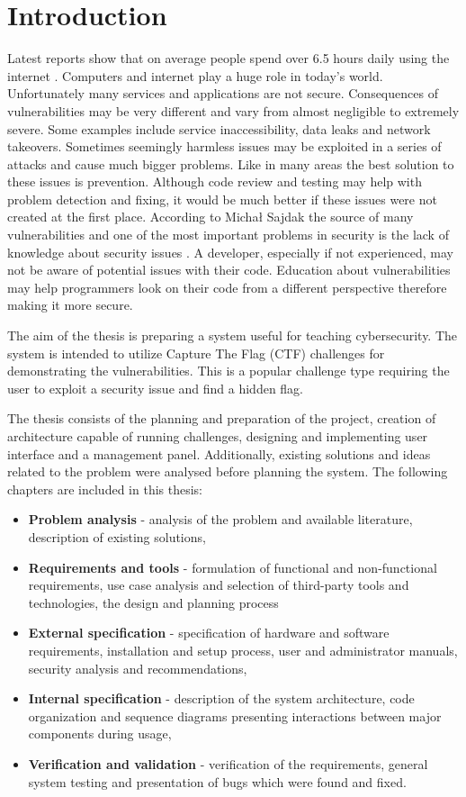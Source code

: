 \chapter{Introduction}

Latest reports show that on average people spend over 6.5 hours daily using the internet \cite{bib:digital-2023}. Computers and internet play a huge role in today's world. Unfortunately many services and applications are not secure. Consequences of vulnerabilities may be very different and vary from almost negligible to extremely severe. Some examples include service inaccessibility, data leaks and network takeovers. Sometimes seemingly harmless issues may be exploited in a series of attacks and cause much bigger problems. Like in many areas the best solution to these issues is prevention. Although code review and testing may help with problem detection and fixing, it would be much better if these issues were not created at the first place. According to Michał Sajdak the source of many vulnerabilities and one of the most important problems in security is the lack of knowledge about security issues \cite{bib:securitum-wstep}. A developer, especially if not experienced, may not be aware of potential issues with their code. Education about vulnerabilities may help programmers look on their code from a different perspective therefore making it more secure.

The aim of the thesis is preparing a system useful for teaching cybersecurity. The system is intended to utilize Capture The Flag (CTF) challenges for demonstrating the vulnerabilities. This is a popular challenge type requiring the user to exploit a security issue and find a hidden flag.

The thesis consists of the planning and preparation of the project, creation of architecture capable of running challenges, designing and implementing user interface and a management panel. Additionally, existing solutions and ideas related to the problem were analysed before planning the system. The following chapters are included in this thesis:

\begin{itemize}
	\item \textbf{Problem analysis} - analysis of the problem and available literature, description of existing solutions,
	\item \textbf{Requirements and tools} - formulation of functional and non-functional requirements, use case analysis and selection of third-party tools and technologies, the design and planning process
	\item \textbf{External specification} - specification of hardware and software requirements, installation and setup process, user and administrator manuals, security analysis and recommendations,
	\item \textbf{Internal specification} - description of the system architecture, code organization and sequence diagrams presenting interactions between major components during usage,
	\item \textbf{Verification and validation} - verification of the requirements, general system testing and presentation of bugs which were found and fixed.
\end{itemize}

